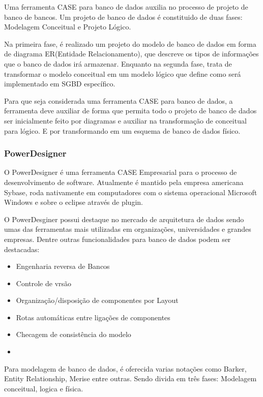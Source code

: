 \documentclass[12pt,a4paper]{article}
\begin{document}
			Uma ferramenta CASE para banco de dados auxilia no processo de projeto de banco de bancos. Um projeto de banco de
			dados é constituido de duas fases: Modelagem Conceitual e Projeto Lógico. 
			
			Na primeira fase, é realizado um projeto do modelo de banco de dados em forma de diagrama ER(Entidade
			Relacionamento), que descreve os tipos de informações que o banco de dados irá armazenar. Enquanto na segunda fase,
			trata de transformar o modelo conceitual em um modelo lógico que define como será implementado em SGBD específico.
			
			Para que seja considerada uma ferramenta CASE para banco de dados, a ferramenta deve auxiliar de forma que permita
			todo o projeto de banco de dados ser inicialmente feito por diagramas e auxiliar na transformação de conceitual para
			lógico. E por transformando em um esquema de banco de dados físico.
			
		\subsubsection{PowerDesigner}
		
			O PowerDesigner é uma ferramenta CASE Empresarial para o processo de desenvolvimento de software. Atualmente é
			mantido pela empresa americana Sybase, roda nativamente em computadores com o sistema operacional Microsoft Windows
			e sobre o eclipse através de plugin.
			
			O PowerDesginer possui destaque no mercado de arquitetura de dados sendo umas das ferramentas mais utilizadas em
			organizações, universidades e grandes empresas. Dentre outras funcionalidades para banco de dados podem ser
			destacadas:
			\begin{itemize}
			  \item Engenharia reversa de Bancos
			  \item Controle de vrsão
			  \item Organização/disposição de componentes por Layout
			  \item Rotas automáticas entre ligações de componentes
			  \item Checagem de consistência do modelo
			  \item
			\end{itemize}
			
			Para modelagem de banco de dados, é oferecida varias notações como Barker, Entity Relationship, Merise entre outras.
			Sendo divida em três fases: Modelagem conceitual, logica e física.
\end{document}
